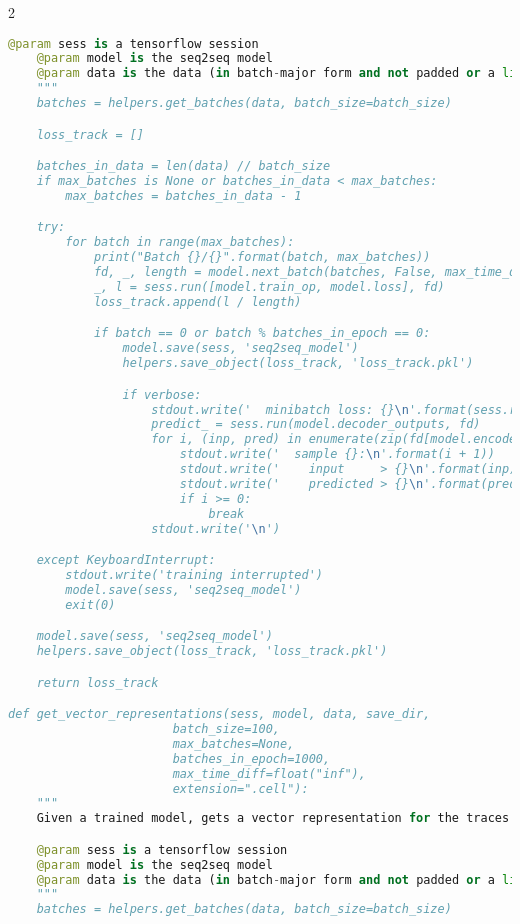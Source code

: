 \begin{landscape}
\begin{multicols}{2}
\begin{lstlisting}[language=Python]
    @param sess is a tensorflow session
    @param model is the seq2seq model
    @param data is the data (in batch-major form and not padded or a list of files (depending on `in_memory`))
    """
    batches = helpers.get_batches(data, batch_size=batch_size)

    loss_track = []

    batches_in_data = len(data) // batch_size
    if max_batches is None or batches_in_data < max_batches:
        max_batches = batches_in_data - 1

    try:
        for batch in range(max_batches):
            print("Batch {}/{}".format(batch, max_batches))
            fd, _, length = model.next_batch(batches, False, max_time_diff)
            _, l = sess.run([model.train_op, model.loss], fd)
            loss_track.append(l / length)

            if batch == 0 or batch % batches_in_epoch == 0:
                model.save(sess, 'seq2seq_model')
                helpers.save_object(loss_track, 'loss_track.pkl')

                if verbose:
                    stdout.write('  minibatch loss: {}\n'.format(sess.run(model.loss, fd)))
                    predict_ = sess.run(model.decoder_outputs, fd)
                    for i, (inp, pred) in enumerate(zip(fd[model.encoder_inputs].swapaxes(0, 1), predict_.swapaxes(0, 1))):
                        stdout.write('  sample {}:\n'.format(i + 1))
                        stdout.write('    input     > {}\n'.format(inp))
                        stdout.write('    predicted > {}\n'.format(pred))
                        if i >= 0:
                            break
                    stdout.write('\n')

    except KeyboardInterrupt:
        stdout.write('training interrupted')
        model.save(sess, 'seq2seq_model')
        exit(0)

    model.save(sess, 'seq2seq_model')
    helpers.save_object(loss_track, 'loss_track.pkl')

    return loss_track

def get_vector_representations(sess, model, data, save_dir,
                       batch_size=100,
                       max_batches=None,
                       batches_in_epoch=1000,
                       max_time_diff=float("inf"),
                       extension=".cell"):
    """
    Given a trained model, gets a vector representation for the traces in batch

    @param sess is a tensorflow session
    @param model is the seq2seq model
    @param data is the data (in batch-major form and not padded or a list of files (depending on `in_memory`))
    """
    batches = helpers.get_batches(data, batch_size=batch_size)


\end{lstlisting}
\end{multicols}
\end{landscape}
